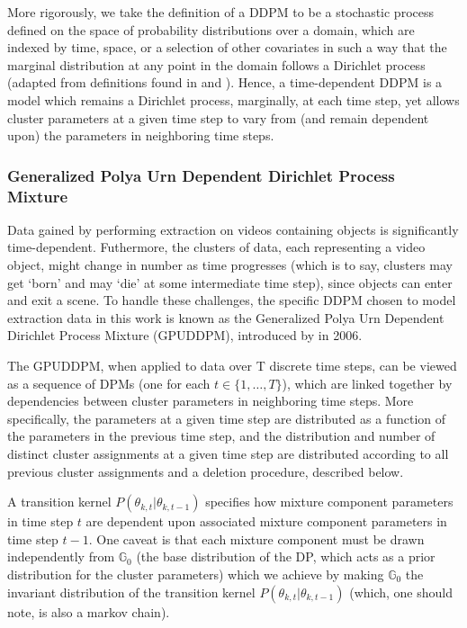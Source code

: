 \documentclass[twocolumn, final]{svjour3}
\begin{document}
More rigorously, we take the definition of a DDPM to be a stochastic process defined on the space of probability distributions over a domain, which are indexed by time, space, or a selection of other covariates in such a way that the marginal distribution at any point in the domain follows a Dirichlet process (adapted from definitions found in \cite{gasthaus_thesis} and \cite{griffin2006order}). Hence, a time-dependent DDPM is a model which remains a Dirichlet process, marginally, at each time step, yet allows cluster parameters at a given time step to vary from (and remain dependent upon) the parameters in neighboring time steps.






\subsubsection{Generalized Polya Urn Dependent Dirichlet Process Mixture}
\label{sec:gpuddpm}

Data gained by performing extraction on videos containing objects is significantly time-dependent. Futhermore, the clusters of data, each representing a video object, might change in number as time progresses (which is to say, clusters may get `born' and may `die' at some intermediate time step), since objects can enter and exit a scene. To handle these challenges, the specific DDPM chosen to model extraction data in this work is known as the Generalized Polya Urn Dependent Dirichlet Process Mixture (GPUDDPM), introduced by \cite{caron_2007} in 2006.

The GPUDDPM, when applied to data over T discrete time steps, can be viewed as a sequence of DPMs (one for each $t \in \{1, \ldots, T \}$), which are linked together by dependencies between cluster parameters in neighboring time steps. More specifically, the parameters at a given time step are distributed as a function of the parameters in the previous time step, and the distribution and number of distinct cluster assignments at a given time step are distributed according to all previous cluster assignments and a deletion procedure, described below.

A transition kernel $P(\theta_{k,t} | \theta_{k,t-1})$ specifies how mixture component parameters in time step $t$ are dependent upon associated mixture component parameters in time step $t-1$. One caveat is that each mixture component must be drawn independently from $\mathbb{G}_{0}$ (the base distribution of the DP, which acts as a prior distribution for the cluster parameters) which we achieve by making $\mathbb{G}_{0}$ the invariant distribution of the transition kernel $P(\theta_{k,t} | \theta_{k,t-1})$ (which, one should note, is also a markov chain).
\end{document}
